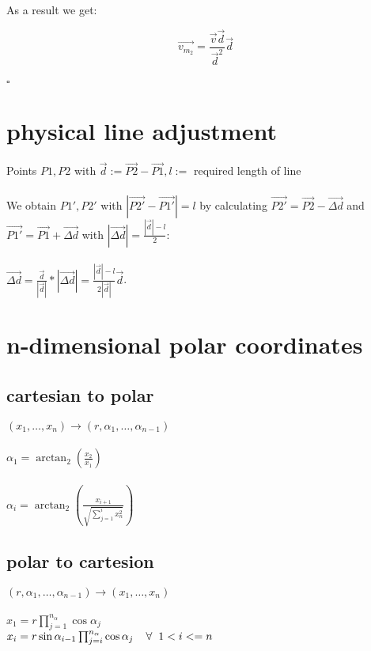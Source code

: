 \documentclass[a4paper]{article}
\newcommand{\spc}{\hspace{0.2cm}}
\begin{document}
As a result we get:

\begin{displaymath}
  \vec{v_{m_2}}=\frac{\vec{v}\vec{d}}{\vec{d}^2}\vec{d}
\end{displaymath}
\\
$\square$

\newpage
\section{physical line adjustment}
Points $P1,P2$ with $\vec{d}:=\vec{P2}-\vec{P1}, l:=$ required length of line\\\\
We obtain $P1',P2'$ with $|\vec{P2'}-\vec{P1'}|=l$ by calculating $\vec{P2'}=\vec{P2}-\vec{\Delta d}$ and $\vec{P1'}=\vec{P1}+\vec{\Delta d}$ with
$|\vec{\Delta d}|=\frac{|\vec{d}|-l}{2}$:\\\\
$\vec{\Delta d}=\frac{\vec{d}}{|\vec{d}|}*|\vec{\Delta d}|=\frac{|\vec{d}|-l}{2|\vec{d}|}\vec{d}$.

\newpage
\section{n-dimensional polar coordinates}
\subsection*{cartesian to polar}
$(x_1,\dots,x_n) \rightarrow (r,\alpha_1,\dots,\alpha_{n-1})$\\
\\
$\alpha_1=\arctan_2(\frac{x_2}{x_1})$\\\\
$\alpha_i=\arctan_2(\frac{x_{i+1}}{\sqrt{\sum_{j=1}^i{x_n^2}}})$
\subsection*{polar to cartesion}
$(r,\alpha_1,\dots,\alpha_{n-1}) \rightarrow (x_1,\dots,x_n)$\\
\\
$x_1=r\prod_{j=1}^{n_{\alpha}}{\cos\alpha_j}$\\
$x_i=r\sin\alpha_{i-1}\prod_{j=i}^{n_{\alpha}}\cos\alpha_j \spc\spc \forall\spc 1<i<=n$

\newpage
\end{document}
